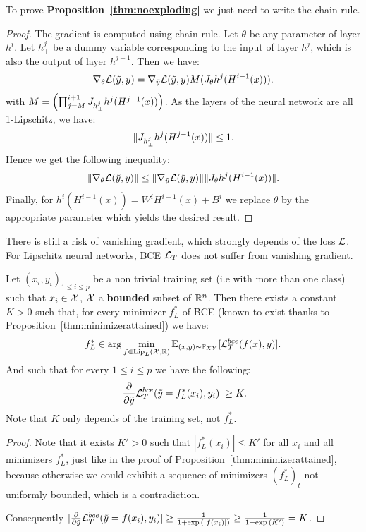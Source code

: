 To prove \textbf{Proposition~\ref{thm:noexploding}} we just need to write the chain rule.
  
\begin{proof}
The gradient is computed using chain rule. Let $\theta$ be any parameter of layer $h^i$. Let $h^j_{\bot}$ be a dummy variable corresponding to the input of layer $h^j$, which is also the output of layer $h^{j-1}$. Then we have:
\begin{equation}
    \nabla_{\theta}\mathcal{L}(\tilde{y},y)=\nabla_{\tilde{y}}\mathcal{L}(\tilde{y},y)M(J_{\theta}h^j(H^{i-1}(x))).
\end{equation}
with $M=\left(\prod_{j=M}^{i+1}J_{h^j_{\bot}}h^j(H^{j-1}(x))\right)$.  
As the layers of the neural network are all \mbox{1-Lipschitz}, we have: $$\|J_{h^j_{\bot}}h^j(H^{j-1}(x))\|\leq 1.$$
Hence we get the following inequality:
\begin{equation}
    \|\nabla_{\theta}\mathcal{L}(\tilde{y},y)\|\leq\|\nabla_{\tilde{y}}\mathcal{L}(\tilde{y},y)\|\|J_{\theta}h^j(H^{i-1}(x))\|.
\end{equation}
Finally, for $h^i(H^{i-1}(x))=W^iH^{i-1}(x)+B^i$ we replace $\theta$ by the appropriate parameter which yields the desired result.
\end{proof}  

There is still a risk of vanishing gradient, which strongly depends of the loss $\mathcal{L}$. For Lipschitz neural networks, BCE $\mathcal{L}_T$ does not suffer from vanishing gradient.  
  
\begin{proposition}\label{thm:novanishing}
Let $(x_i,y_i)_{1\leq i\leq p}$ be a non trivial training set (i.e with more than one class) such that $x_i\in\mathcal{X}$, $\mathcal{X}$ a \textbf{bounded} subset of $\mathbb{R}^n$. Then there exists a constant $K>0$ such that, for every minimizer $f_L^{*}$ of BCE (known to exist thanks to Proposition~\ref{thm:minimizerattained}) we have:
\begin{equation}
    f_L^{*}\in\arg\min_{f\in\text{Lip}_L(\mathcal{X},\mathbb{R})}\mathbb{E}_{(x,y)\sim\mathbb{P}_{XY}}[\mathcal{L}^{bce}_T(f(x),y)].
\end{equation}
And such that for every $1\leq i\leq p$ we have the following:  
\begin{equation}
    |\frac{\partial}{\partial{\tilde{y}}}\mathcal{L}^{bce}_T(\tilde{y}=f_L^{*}(x_i),y_i)|\geq K.
\end{equation}
Note that $K$ only depends of the training set, not $f_L^{*}$.  
\end{proposition}  
\begin{proof}
  
Note that it exists $K'>0$ such that $|f_L^{*}(x_i)|\leq K'$ for all $x_i$ and all minimizers $f_L^{*}$, just like in the proof of Proposition~\ref{thm:minimizerattained}, because otherwise we could exhibit a sequence of minimizers $(f_L^{*})_t$ not uniformly bounded, which is a contradiction.  
  
Consequently $|\frac{\partial}{\partial{\tilde{y}}}\mathcal{L}^{bce}_T(\tilde{y}=f(x_i),y_i)|\geq \frac{1}{1+\exp{(|f(x_i)|)}}\geq\frac{1}{1+\exp{(K')}}=K$.  
\end{proof}  
  
